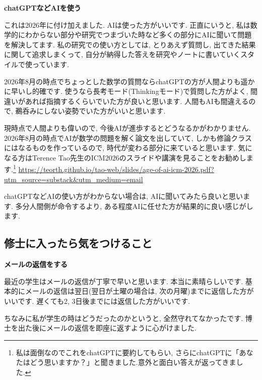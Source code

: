 \textbf{chatGPTなどAIを使う}  　\vspace{-6pt} 

これは2026年に付け加えました. AIは使った方がいいです. 
正直にいうと, 私は数学的にわからない部分や研究でつまづいた時など多くの部分にAIに聞いて問題を解決してます.  私の研究での使い方としては, とりあえず質問し, 出てきた結果に関して追求しまくって, 自分が納得した答えを研究やノートに書いていくスタイルで使っています. 

2026年8月の時点でちょっとした数学の質問ならchatGPTの方が人間よりも遥かに早いし的確です. 使うなら長考モード(Thinkingモード)で質問した方がよく, 間違いがあれば指摘するくらいでいた方が良いと思います. 人間もAIも間違えるので, 鵜呑みにしない姿勢でいた方がいいと思います. 

現時点で人間よりも偉いので, 今後AIが進歩するとどうなるかがわかりません. 
2026年8月の時点でAIが数学の問題を解く論文を出していて, しかも修論クラスにはなるものを作っているので, 時代が変わる部分に来ていると思います. 
気になる方はTerence Tao先生のICM2026のスライドや講演を見ることをお勧めします.\footnote{私は面倒なのでこれをchatGPTに要約してもらい, さらにchatGPTに「あなたはどう思いますか？」と聞きました.意外と面白い答えが返ってきました. }
\url{https://teorth.github.io/tao-web/slides/age-of-ai-icm-2026.pdf?utm_source=substack&utm_medium=email}

chatGPTなどAIの使い方がわからない場合は, AIに聞いてみたら良いと思います. 
多分人間側が命令するより, ある程度AIに任せた方が結果的に良い感じがします. 

\vspace{8pt} 

\subsection{修士に入ったら気をつけること}

\textbf{メールの返信をする}  　\vspace{-6pt} 

最近の学生はメールの返信が丁寧で早いと思います. 本当に素晴らしいです. 
基本的にメールの返信は翌日(翌日が土曜の場合は, 次の月曜)までに返信した方がいいです. 遅くても2, 3日後までには返信した方がいいです. 

ちなみに私が学生の時はどうだったのかというと, 全然守れてなかったです. 博士を出た後にメールの返信を即座に返すように心がけました. 

\vspace{8pt} 

